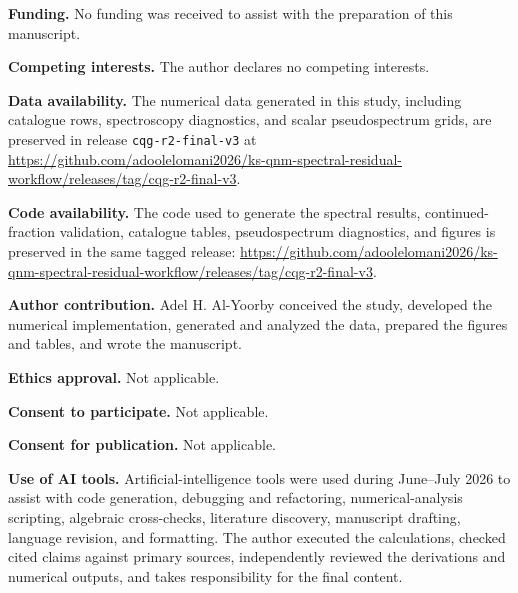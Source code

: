 \documentclass[12pt,a4paper]{article}
\begin{document}
\noindent\textbf{Funding.}
No funding was received to assist with the preparation of this manuscript.

\noindent\textbf{Competing interests.}
The author declares no competing interests.

\noindent\textbf{Data availability.}
The numerical data generated in this study, including catalogue rows,
spectroscopy diagnostics, and scalar pseudospectrum grids, are preserved in
release \texttt{cqg-r2-final-v3} at
\url{https://github.com/adoolelomani2026/ks-qnm-spectral-residual-workflow/releases/tag/cqg-r2-final-v3}.

\noindent\textbf{Code availability.}
The code used to generate the spectral results, continued-fraction validation,
catalogue tables, pseudospectrum diagnostics, and figures is preserved in the
same tagged release:
\url{https://github.com/adoolelomani2026/ks-qnm-spectral-residual-workflow/releases/tag/cqg-r2-final-v3}.

\noindent\textbf{Author contribution.}
Adel H. Al-Yoorby conceived the study, developed the numerical implementation, generated and analyzed the data, prepared the figures and tables, and wrote the manuscript.

\noindent\textbf{Ethics approval.}
Not applicable.

\noindent\textbf{Consent to participate.}
Not applicable.

\noindent\textbf{Consent for publication.}
Not applicable.

\noindent\textbf{Use of AI tools.}
Artificial-intelligence tools were used during June--July 2026 to assist with
code generation, debugging and refactoring,
numerical-analysis scripting, algebraic cross-checks, literature discovery,
manuscript drafting, language revision, and formatting. The author executed
the calculations, checked cited claims against primary sources, independently
reviewed the derivations and numerical outputs, and takes responsibility for
the final content.
\end{document}

